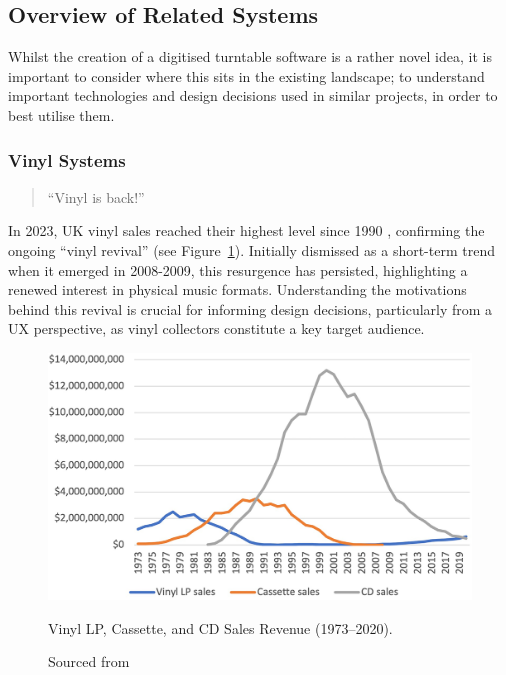       \subsection{Overview of Related Systems}
    
        Whilst the creation of a digitised turntable software is a rather novel idea, it is important to consider where this sits in the existing landscape; to understand important technologies and design decisions used in similar projects, in order to best utilise them.
      
        \subsubsection{Vinyl Systems}
    
            \begin{quote}
                ``Vinyl is back!'' \cite{bechhofervttspec}
            \end{quote}
            
            In 2023, UK vinyl sales reached their highest level since 1990 \cite{geraghty2023uk_vinyl_sales}, confirming the ongoing ``vinyl revival'' \cite{vinylRevival} (see Figure~\ref{fig:vinyl_sales}). Initially dismissed as a short-term trend when it emerged in 2008-2009, this resurgence has persisted, highlighting a renewed interest in physical music formats. Understanding the motivations behind this revival is crucial for informing design decisions, particularly from a UX perspective, as vinyl collectors constitute a key target audience.
            
            \begin{figure}[htbp]
                \centering
                \includegraphics[width=\linewidth]{images/vinyl_sales_2023.png}
                \caption{Vinyl LP, Cassette, and CD Sales Revenue (1973–2020).}
                \caption*{Sourced from \cite{vinylRevival}}
                \label{fig:vinyl_sales}
            \end{figure}
    
